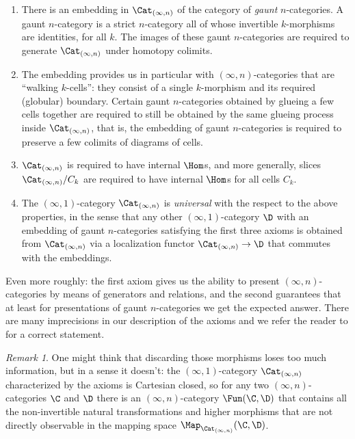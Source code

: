 \documentclass[12pt]{amsart}
\theoremstyle{definition} \newtheorem{definition}[theorem]{Definition}
\theoremstyle{remark} \newtheorem{remark}[theorem]{Remark}
\numberwithin{equation}{section}
\newcommand{\oo}{\infty}
\newcommand{\io}{$(\oo,1)$}
\newcommand{\Catin}{\Cat_{(\oo,n)}}
\begin{document}
\begin{enumerate}
  \item There is an embedding in $\Catin$ of the category of
    \emph{gaunt} $n$-categories. A gaunt $n$-category is a strict
    $n$-category all of whose invertible $k$-morphisms are identities,
    for all $k$. The images of these gaunt $n$-categories are
    required to generate $\Catin$ under homotopy colimits.
  \item The embedding provides us in particular with
    $(\oo,n)$-categories that are ``walking $k$-cells'': they consist
    of a single $k$-morphism and its required (globular) boundary.
    Certain gaunt $n$-categories obtained by glueing a few cells
    together are required to still be obtained by the same glueing
    process inside $\Catin$, that is, the embedding of gaunt
    $n$-categories is required to preserve a few colimits of diagrams
    of cells.
  \item $\Catin$ is required to have internal $\Hom$s, and more
    generally, slices $\Catin/C_k$ are required to have internal
    $\Hom$s for all cells $C_k$.
  \item The \io-category $\Catin$ is \emph{universal} with the respect
    to the above properties, in the sense that any other \io-category
    $\D$ with an embedding of gaunt $n$-categories satisfying the first
    three axioms is obtained from $\Catin$ via a localization functor
    $\Catin \to \D$ that commutes with the embeddings.
\end{enumerate}

Even more roughly: the first axiom gives us the ability to present
$(\oo,n)$-categories by means of generators and relations, and the
second guarantees that at least for presentations of gaunt
$n$-categories we get the expected answer. There are many imprecisions
in our description of the axioms and we refer the reader to
\cite{ClarkChris} for a correct statement.

\begin{remark}
  One might think that discarding those morphisms loses too much
  information, but in a sense it doesn't: the \io-category
  $\Catin$ characterized by the axioms is Cartesian closed, so
  for any two $(\oo,n)$-categories $\C$ and $\D$ there is an
  $(\oo,n)$-category $\Fun(\C,\D)$ that contains all the non-invertible
  natural transformations and higher morphisms that are not directly
  observable in the mapping space $\Map_{\Catin}(\C,\D)$.
\end{remark}
\end{document}
